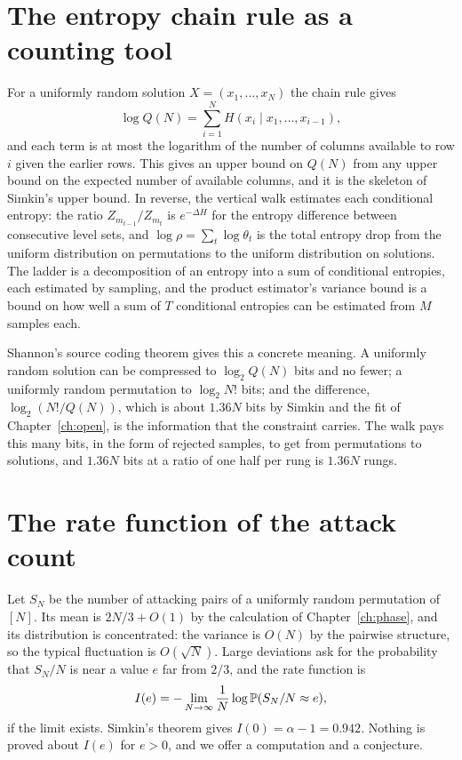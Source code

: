 \section{The entropy chain rule as a counting tool}

For a uniformly random solution $X = (x_1, \dots, x_N)$ the chain rule gives
\[
\log Q(N) = \sum_{i=1}^{N} H(x_i \mid x_1, \dots, x_{i-1}) ,
\]
and each term is at most the logarithm of the number of columns available to row $i$ given the earlier rows. This gives an upper bound on $Q(N)$ from any upper bound on the expected number of available columns, and it is the skeleton of Simkin's upper bound. In reverse, the vertical walk estimates each conditional entropy: the ratio $Z_{m_{t-1}} / Z_{m_t}$ is $e^{-\Delta H}$ for the entropy difference between consecutive level sets, and $\log \rho = \sum_t \log \theta_t$ is the total entropy drop from the uniform distribution on permutations to the uniform distribution on solutions. The ladder is a decomposition of an entropy into a sum of conditional entropies, each estimated by sampling, and the product estimator's variance bound is a bound on how well a sum of $T$ conditional entropies can be estimated from $M$ samples each.

Shannon's source coding theorem gives this a concrete meaning. A uniformly random solution can be compressed to $\log_2 Q(N)$ bits and no fewer; a uniformly random permutation to $\log_2 N!$ bits; and the difference, $\log_2 (N! / Q(N))$, which is about $1.36 N$ bits by Simkin and the fit of Chapter~\ref{ch:open}, is the information that the constraint carries. The walk pays this many bits, in the form of rejected samples, to get from permutations to solutions, and $1.36 N$ bits at a ratio of one half per rung is $1.36 N$ rungs.

\section{The rate function of the attack count}

Let $S_N$ be the number of attacking pairs of a uniformly random permutation of $[N]$. Its mean is $2N/3 + O(1)$ by the calculation of Chapter~\ref{ch:phase}, and its distribution is concentrated: the variance is $O(N)$ by the pairwise structure, so the typical fluctuation is $O(\sqrt N)$. Large deviations ask for the probability that $S_N / N$ is near a value $e$ far from $2/3$, and the rate function is
\[
I(e) = -\lim_{N \to \infty} \frac{1}{N} \log \mathbb{P}( S_N / N \approx e ) ,
\]
if the limit exists. Simkin's theorem gives $I(0) = \alpha - 1 = 0.942$. Nothing is proved about $I(e)$ for $e > 0$, and we offer a computation and a conjecture.


